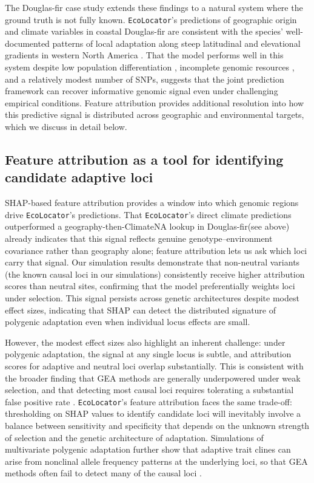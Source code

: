 \documentclass[]{article}
\newcommand{\dfir}{Douglas-fir\xspace}
\newcommand{\ecolocator}{\texttt{EcoLocator}\xspace}
\providecommand{\revpoint}[2]{}%
\begin{document}
The \dfir case study extends these findings to a natural 
system where the ground truth is not fully known. 
\ecolocator's predictions of geographic origin and 
climate variables in coastal \dfir are consistent with the 
species' well-documented patterns of local adaptation along steep 
latitudinal and elevational gradients in western 
North America \citep{stclair_genecology_2005, stclair_1912_2020}\revpoint{2}{15}. 
That the model performs well in this system
despite low population differentiation \citep{krutovsky_estimation_2009}, 
incomplete genomic resources \citep{neale_douglas-fir_2017}, 
and a relatively modest number of SNPs, 
suggests that the joint prediction framework can recover 
informative genomic signal even under challenging empirical conditions. 
Feature attribution provides additional resolution into how this 
predictive signal is distributed across geographic and environmental
targets, which we discuss in detail below.


\subsection{Feature attribution as a tool for identifying candidate adaptive loci}

SHAP-based feature attribution provides a window
into which genomic regions drive \ecolocator's predictions. That
\ecolocator's direct climate predictions outperformed a
geography-then-ClimateNA lookup in \dfir (see above) already indicates
that this signal reflects genuine genotype--environment covariance
rather than geography alone; feature attribution lets us ask which
loci carry that signal. Our simulation results demonstrate
that non-neutral variants (the known causal loci in our simulations)\revpoint{2}{16} 
consistently receive
higher attribution scores than neutral sites,
confirming that the model preferentially weights loci
under selection.
This signal persists across genetic architectures
despite modest effect sizes,
indicating that SHAP can detect the distributed signature
of polygenic adaptation
even when individual locus effects are small.

However,
the modest effect sizes also highlight
an inherent challenge:
under polygenic adaptation,
the signal at any single locus is subtle,
and attribution scores for adaptive and neutral loci
overlap substantially.
This is consistent with the broader finding
that GEA methods are generally underpowered
under weak selection,
and that detecting most causal loci
requires tolerating a substantial false positive rate
\citep{lotterhos_whitlock_2015, booker_wza_2024}.
\ecolocator's feature attribution faces the same trade-off:
thresholding on SHAP values to identify candidate loci
will inevitably involve a balance
between sensitivity and specificity
that depends on the unknown strength of selection
and the genetic architecture of adaptation.
Simulations of multivariate polygenic adaptation further show that
adaptive trait clines can arise from nonclinal allele frequency patterns
at the underlying loci, so that GEA methods often fail
to detect many of the causal loci \citep{lotterhos_paradox_2023}\revpoint{2}{17}.
\end{document}
